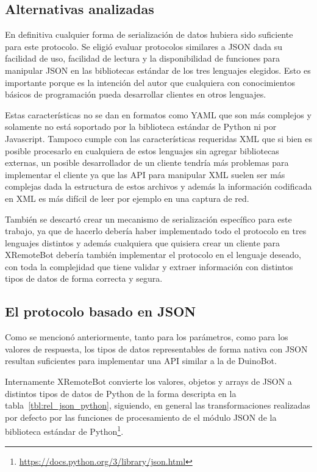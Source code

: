 \subsection{Alternativas analizadas}\label{sec:alternativas}
En definitiva cualquier forma de serialización de datos hubiera
sido suficiente para este protocolo. Se eligió evaluar protocolos
similares a JSON dada su facilidad de uso, facilidad de lectura
y la disponibilidad
de funciones para manipular JSON en las bibliotecas estándar
de los tres lenguajes elegidos. Esto es importante porque es
la intención del autor que cualquiera con conocimientos básicos
de programación pueda desarrollar clientes en otros lenguajes.

Estas características no se dan en formatos como YAML que
son más complejos y solamente no está soportado por la biblioteca
estándar de Python ni por Javascript. Tampoco cumple con las características
requeridas XML que si bien es posible
procesarlo en cualquiera de estos lenguajes sin agregar bibliotecas
externas, un posible desarrollador de un cliente tendría más
problemas para implementar el cliente ya que las API para
manipular XML suelen
ser más complejas dada la estructura de estos archivos y además
la información codificada en XML es más difícil de leer por
ejemplo en una captura de red.

También se descartó crear un mecanismo de serialización específico
para este trabajo, ya que de hacerlo debería haber implementado
todo el protocolo en tres lenguajes distintos y además cualquiera
que quisiera crear un cliente para XRemoteBot debería también
implementar el protocolo en el lenguaje deseado, con toda
la complejidad que tiene validar y extraer información con
distintos tipos de datos de forma correcta y segura.

\subsection{El protocolo basado en JSON}

Como se mencionó anteriormente, tanto para los parámetros, como para los valores de respuesta, los tipos
de datos representables de forma nativa con JSON resultan suficientes para
implementar una API similar a la de DuinoBot.

Internamente XRemoteBot
convierte los valores, objetos y arrays de JSON a distintos tipos de
datos de Python de la forma descripta en la
tabla~\ref{tbl:rel_json_python}, siguiendo, en general las transformaciones
realizadas por defecto por las funciones de procesamiento de el módulo
JSON de la biblioteca estándar de
Python\footnote{\url{https://docs.python.org/3/library/json.html}}.

